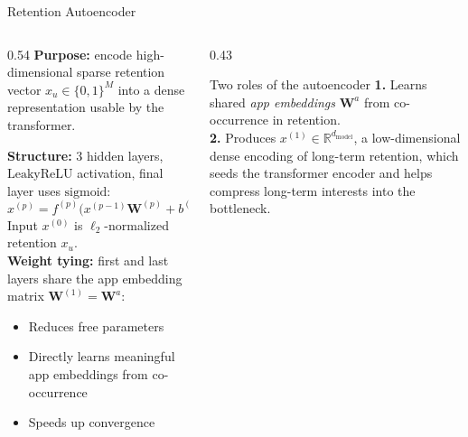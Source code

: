 \documentclass[aspectratio=169,t]{beamer}
\begin{document}
\begin{frame}[shrink=10]{Retention Autoencoder}
    \begin{columns}[T]
      \begin{column}{0.54\textwidth}
        \textbf{Purpose:} encode high-dimensional sparse retention vector $x_u \in \{0,1\}^M$ into a dense representation usable by the transformer.
        \vspace{0.3cm}
  
        \textbf{Structure:} 3 hidden layers, $\text{LeakyReLU}$ activation, final layer uses $\text{sigmoid}$:
        \[
          x^{(p)} = f^{(p)}\!\bigl(x^{(p-1)}\mathbf{W}^{(p)} + b^{(p)}\bigr), \quad p \in \{1,2,3,4\}
        \]
        Input $x^{(0)}$ is $\ell_2$-normalized retention $x_u$.\\[0.3cm]
        \textbf{Weight tying:} first and last layers share the app embedding matrix $\mathbf{W}^{(1)} = \mathbf{W}^a$:
        \begin{itemize}
          \item Reduces free parameters
          \item Directly learns meaningful app embeddings from co-occurrence
          \item Speeds up convergence
        \end{itemize}
      \end{column}
      \begin{column}{0.43\textwidth}
        \vspace{0.4cm}
        \begin{block}{Two roles of the autoencoder}
          \textbf{1.} Learns shared \emph{app embeddings} $\mathbf{W}^a$ from co-occurrence in retention.\\[0.3cm]
          \textbf{2.} Produces $x^{(1)} \in \mathbb{R}^{d_\text{model}}$, a low-dimensional dense encoding of long-term retention, which seeds the transformer encoder and helps compress long-term interests into the bottleneck.
        \end{block}
      \end{column}
    \end{columns}
  \end{frame}
\end{document}
